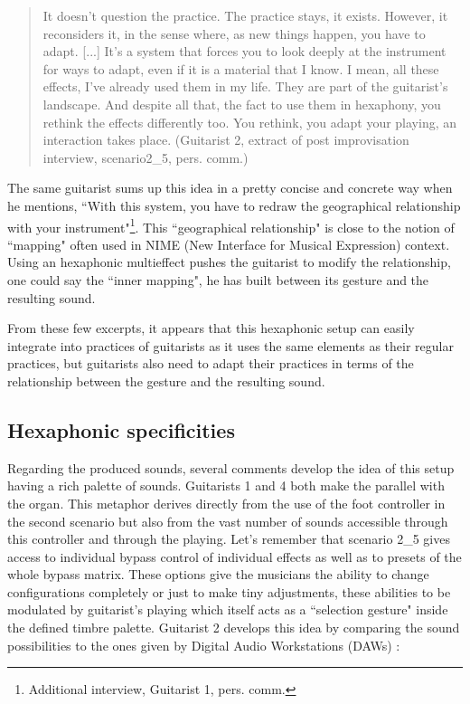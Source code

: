 \documentclass{article}
\begin{document}
    \begin{quote}
     It doesn't question the practice. The practice stays, it exists. However, it reconsiders it, in the sense where, as new things happen, you have to adapt. [...] It's a system that forces you to look deeply at the instrument for ways to adapt, even if it is a material that I know. I mean, all these effects, I've already used them in my life. They are part of the guitarist's landscape. And despite all that, the fact to use them in hexaphony, you rethink the effects differently too. You rethink, you adapt your playing, an interaction takes place. (Guitarist 2, extract of post improvisation interview, scenario2\_5, pers. comm.)
    \end{quote}

The same guitarist sums up this idea in a pretty concise and concrete way when he mentions, ``With this system, you have to redraw the geographical relationship with your instrument"\footnote{Additional interview, Guitarist 1, pers. comm.}. This ``geographical relationship" is close to the notion of ``mapping" often used in NIME (New Interface for Musical Expression) context. Using an hexaphonic multieffect pushes the guitarist to modify the relationship, one could say the ``inner mapping", he has built between its gesture and the resulting sound. 

From these few excerpts, it appears that this hexaphonic setup can easily integrate into practices of guitarists as it uses the same elements as their regular practices, but guitarists also need to adapt their practices in terms of the relationship between the gesture and the resulting sound.




\subsection{Hexaphonic specificities}

Regarding the produced sounds, several comments develop the idea of this setup having a rich palette of sounds. Guitarists 1 and 4 both make the parallel with the organ. This metaphor derives directly from the use of the foot controller in the second scenario but also from the vast number of sounds accessible through this controller  and through the playing.  Let's remember that scenario 2\_5 gives access to individual bypass control of individual effects as well as to presets of the whole bypass matrix. These options give the musicians the ability to change configurations completely or just to make tiny adjustments, these abilities to be modulated by guitarist's playing which itself acts as a ``selection gesture" \cite{sci:Cadoz94} inside the defined timbre palette.
Guitarist 2 develops this idea by comparing the sound possibilities to the ones given by Digital Audio Workstations (DAWs) : 
\end{document}
